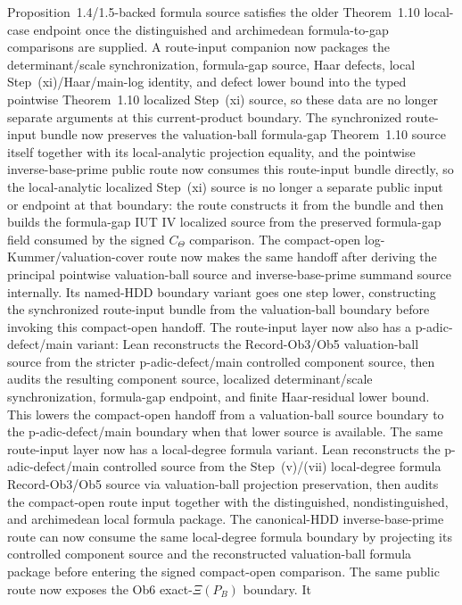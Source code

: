 \documentclass[11pt]{article}
\newcommand{\IUT}{IUT}
\theoremstyle{plain}
\theoremstyle{definition}
\theoremstyle{remark}
\begin{document}
Proposition~1.4/1.5-backed formula source satisfies the older Theorem~1.10
local-case endpoint once the distinguished and archimedean formula-to-gap
comparisons are supplied.  A route-input companion now packages the determinant/scale
synchronization, formula-gap source, Haar defects, local
Step~(xi)/Haar/main-log identity, and defect lower bound into the typed
pointwise Theorem~1.10 localized Step~(xi) source, so these data are no longer
separate arguments at this current-product boundary.  The synchronized
route-input bundle now preserves the valuation-ball formula-gap Theorem~1.10
source itself together with its local-analytic projection equality, and the
pointwise
inverse-base-prime
public route now consumes this route-input bundle directly, so the
local-analytic localized Step~(xi) source is no longer a separate public input
or endpoint at that boundary: the route constructs it from the bundle and then
builds the formula-gap \IUT{} IV localized source from the preserved
formula-gap field consumed by the signed \(C_\Theta\) comparison.  The compact-open
log-Kummer/valuation-cover route now makes the same handoff after deriving the
principal pointwise valuation-ball source and inverse-base-prime summand source
internally.  Its named-HDD boundary
variant goes one step lower, constructing the synchronized route-input bundle
from the valuation-ball boundary before invoking this compact-open handoff.
The route-input layer now also has a p-adic-defect/main variant: Lean
reconstructs the Record-Ob3/Ob5 valuation-ball source from the stricter
p-adic-defect/main controlled component source, then audits the resulting
component source, localized determinant/scale synchronization, formula-gap
endpoint, and finite Haar-residual lower bound.  This lowers the compact-open
handoff from a valuation-ball source boundary to the p-adic-defect/main
boundary when that lower source is available.
The same route-input layer now has a local-degree formula variant.  Lean
reconstructs the p-adic-defect/main controlled source from the Step~(v)/(vii)
local-degree formula Record-Ob3/Ob5 source via valuation-ball projection
preservation, then audits the compact-open route input together with the
distinguished, nondistinguished, and archimedean local formula package.
The canonical-HDD inverse-base-prime route can now consume the same
local-degree formula boundary by projecting its controlled component source and
the reconstructed valuation-ball formula package before entering the signed
compact-open comparison.
The same public route now exposes the Ob6 exact-\(\Xi(P_B)\) boundary.  It
\end{document}
